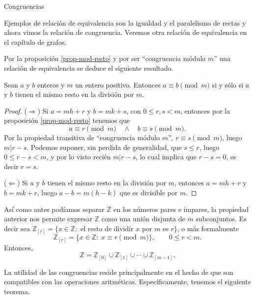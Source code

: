 \begin{section}{Congruencias}
\begin{observacion*}
    Ejemplos de relación de equivalencia son la igualdad y  el paralelismo de rectas y ahora vimos la relación de congruencia. Veremos otra relación de equivalencia en el capítulo de grafos.
\end{observacion*}

Por la proposición \ref{prop-mod-resto} y por ser ``congruencia módulo $m$'' una relación de equivalencia se deduce el siguiente resultado. 

\begin{proposicion}
Sean $a$ y $b$ enteros y $m$ un entero positivo. Entonces $a\equiv b \pmod{m}$ si  y sólo si $a$ y $b$ tienen el mismo resto en la división por $m$.
\end{proposicion}
\begin{proof} ($\Rightarrow$)
Si $a=mh+r$ y $b=mk+s$, con $0 \le r,s <m$, entonces por la proposición \ref{prop-mod-resto} tenemos que
\begin{equation*}
    a \equiv r \pmod{m} \quad \wedge \quad     b \equiv s \pmod{m}.
\end{equation*}
Por la propiedad transitiva de ``congruencia módulo $m$'', $ r \equiv s \pmod{m}$, luego $m | r-s$.  Podemos suponer, sin perdida de generalidad, que $s \le r$, luego $0\le r-s< m$,  y por lo visto recién $m | r-s$, lo cual implica que $r-s=0$,  es decir $r=s$. 

($\Leftarrow$) Si $a$ y $b$ tienen el mismo resto en la división por $m$, entonces  $a=mh+r$ y $b=mk+r$, luego $a-b = m(h-k)$ que es divisible por $m$.
\end{proof}

Así como antes podíamos separar $\mathbb Z$ en los números pares e impares, la propiedad anterior nos permite expresar $\mathbb Z$ como una unión disjunta de $m$ subconjuntos. Es decir sea $\mathbb  Z_{[r]} =\{x \in \mathbb Z:$ el resto de dividir $x$ por $m$ es $r\}$, o más formalmente 
\begin{equation*}
    \mathbb  Z_{[r]} =\{x \in \mathbb Z: \; x \equiv r \pmod{m} \}, \qquad 0 \le r < m.
\end{equation*}
Entonces, 
$$
\mathbb Z= \mathbb Z_{[0]}\cup \mathbb Z_{[1]}\cup \cdots\cup \mathbb Z_{[m-1]}.
$$




La utilidad de las congruencias reside principalmente en el hecho de que son compatibles con las operaciones aritméticas. Específicamente, tenemos el siguiente teorema.


\end{section}
